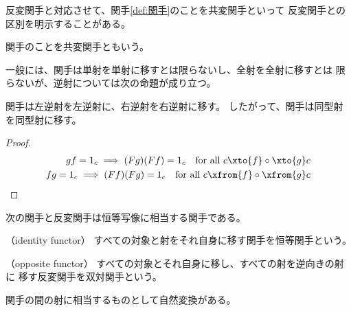 	反変関手と対応させて、関手\ref{def:関手}のことを共変関手といって
	反変関手との区別を明示することがある。

	\begin{definition}[共変関手]\label{def:共変関手} %
		関手のことを共変関手ともいう。
	\end{definition} %

	一般には、関手は単射を単射に移すとは限らないし、全射を全射に移すとは
	限らないが、逆射については次の命題が成り立つ。

	\begin{proposition}[関手と逆射]\label{prop:関手と逆射} %
		関手は左逆射を左逆射に、右逆射を右逆射に移す。
		したがって、関手は同型射を同型射に移す。
	\end{proposition} %
	\begin{proof} %
		\begin{equation*}\begin{split} %
			gf = 1_c \implies (Fg)(Ff) = 1_c
			\quad\text{for all }c\xto{f}\circ\xto{g}c \\
			fg = 1_c \implies (Ff)(Fg) = 1_c
			\quad\text{for all }c\xfrom{f}\circ\xfrom{g}c \\
		\end{split}\end{equation*} %
	\end{proof} %

	次の関手と反変関手は恒等写像に相当する関手である。
	\begin{description}\setlength{\itemsep}{-1mm} %
		\item[恒等関手] （identity functor）
		すべての対象と射をそれ自身に移す関手を恒等関手という。
		\item[双対関手] （opposite functor）
		すべての対象とそれ自身に移し、すべての射を逆向きの射に
		移す反変関手を双対関手という。
	\end{description} %

	関手の間の射に相当するものとして自然変換がある。

